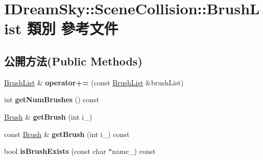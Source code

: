\hypertarget{class_i_dream_sky_1_1_scene_collision_1_1_brush_list}{}\section{I\+Dream\+Sky\+:\+:Scene\+Collision\+:\+:Brush\+List 類別 參考文件}
\label{class_i_dream_sky_1_1_scene_collision_1_1_brush_list}
\subsection*{公開方法(Public Methods)}
\begin{DoxyCompactItemize}
\item 
\hyperlink{class_i_dream_sky_1_1_scene_collision_1_1_brush_list}{Brush\+List} \& {\bfseries operator+=} (const \hyperlink{class_i_dream_sky_1_1_scene_collision_1_1_brush_list}{Brush\+List} \&brush\+List)\hypertarget{class_i_dream_sky_1_1_scene_collision_1_1_brush_list_aba29e308fc129fd9c3f97ef2346f9ca9}{}\label{class_i_dream_sky_1_1_scene_collision_1_1_brush_list_aba29e308fc129fd9c3f97ef2346f9ca9}

\item 
int {\bfseries get\+Num\+Brushes} () const \hypertarget{class_i_dream_sky_1_1_scene_collision_1_1_brush_list_ae88aecb837a7bf3674c089823b0c2c1e}{}\label{class_i_dream_sky_1_1_scene_collision_1_1_brush_list_ae88aecb837a7bf3674c089823b0c2c1e}

\item 
\hyperlink{class_i_dream_sky_1_1_scene_collision_1_1_brush}{Brush} \& {\bfseries get\+Brush} (int i\+\_\+)\hypertarget{class_i_dream_sky_1_1_scene_collision_1_1_brush_list_aa584d14d5ce9db2fc317a7e03d529f37}{}\label{class_i_dream_sky_1_1_scene_collision_1_1_brush_list_aa584d14d5ce9db2fc317a7e03d529f37}

\item 
const \hyperlink{class_i_dream_sky_1_1_scene_collision_1_1_brush}{Brush} \& {\bfseries get\+Brush} (int i\+\_\+) const \hypertarget{class_i_dream_sky_1_1_scene_collision_1_1_brush_list_af44c97065c29118473488e8f935c6e59}{}\label{class_i_dream_sky_1_1_scene_collision_1_1_brush_list_af44c97065c29118473488e8f935c6e59}

\item 
bool {\bfseries is\+Brush\+Exists} (const char $\ast$name\+\_\+) const \hypertarget{class_i_dream_sky_1_1_scene_collision_1_1_brush_list_a7f3e8b4fd00c207a036151874d6b952a}{}\label{class_i_dream_sky_1_1_scene_collision_1_1_brush_list_a7f3e8b4fd00c207a036151874d6b952a}


\end{DoxyCompactItemize}
